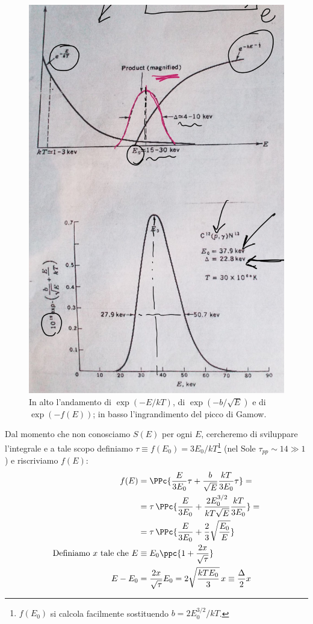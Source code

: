 \begin{figure}[h]
    \centering
    \includegraphics[scale=0.2]{Immagini/0324_gamow2.png}
    \caption{In alto l'andamento di $\exp{(-E/kT)}$, di $\exp{(-b/\sqrt{E})}$ e di $\exp{(-f(E))}$; in basso l'ingrandimento del picco di Gamow.}
    \label{0324_picco}
\end{figure}
\noindent Dal momento che non conosciamo $S(E)$ per ogni $E$, cercheremo di sviluppare l'integrale e a tale scopo definiamo $\tau\equiv f(E_0)= 3E_0/kT$\footnote{$f(E_0)$ si calcola facilmente sostituendo $b=2E_0^{3/2}/kT$.} (nel Sole $\tau_{pp}\sim 14\gg 1$) e riscriviamo $f(E)$:
\begin{align*}
f(E) &= \PPc{\frac{E}{3E_0}\tau + \frac{b}{\sqrt{E}}\frac{kT}{3E_0} \tau} =\\
&= \tau \, \PPc{\frac{E}{3E_0} + \frac{2E_0^{3/2}}{kT \sqrt{E}}\frac{kT}{3E_0}} =\\
&= \tau \, \PPc{\frac{E}{3E_0} + \frac{2}{3}\sqrt{\frac{E_0}{E}}}\\
\text{Definiamo } x \text{ tale che } E&\equiv E_0 \ppc{1+\frac{2x}{\sqrt{\tau}}}\\
E-E_0 &= \frac{2x}{\sqrt{\tau}}E_0 = 2\sqrt{\frac{kTE_0}{3}}\,x \equiv \frac{\Delta}{2} x
\end{align*}
